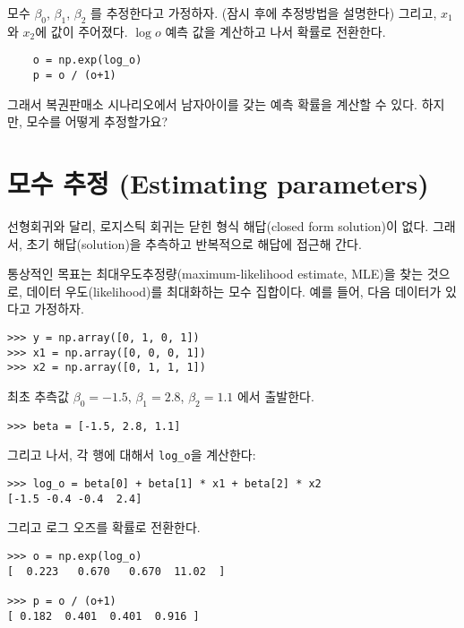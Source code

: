 모수 $\beta_0$, $\beta_1$, $\beta_2$ 를 추정한다고 가정하자.
 (잠시 후에 추정방법을 설명한다)
그리고, $x_1$와 $x_2$에 값이 주어졌다. 
$\log o$ 예측 값을 계산하고 나서 확률로 전환한다.

\begin{verbatim}
    o = np.exp(log_o)
    p = o / (o+1)
\end{verbatim}

그래서 복권판매소 시나리오에서 남자아이를 갖는 예측 확률을 계산할 수 있다. 하지만, 모수를 어떻게 추정할가요?

\section{모수 추정 (Estimating parameters)}

선형회귀와 달리, 로지스틱 회귀는 닫힌 형식 해답(closed form solution)이 없다. 그래서, 초기 해답(solution)을 추측하고 반복적으로 해답에 접근해 간다.

통상적인 목표는 최대우도추정량(maximum-likelihood estimate, MLE)을 찾는 것으로, 데이터 우도(likelihood)를 최대화하는 모수 집합이다.
예를 들어, 다음 데이터가 있다고 가정하자.

\begin{verbatim}
>>> y = np.array([0, 1, 0, 1])
>>> x1 = np.array([0, 0, 0, 1])
>>> x2 = np.array([0, 1, 1, 1])
\end{verbatim}

최초 추측값 $\beta_0=-1.5$, $\beta_1=2.8$, $\beta_2=1.1$ 에서 출발한다.

\begin{verbatim}
>>> beta = [-1.5, 2.8, 1.1]
\end{verbatim}

그리고 나서, 각 행에 대해서 \verb"log_o"을 계산한다:

\begin{verbatim}
>>> log_o = beta[0] + beta[1] * x1 + beta[2] * x2 
[-1.5 -0.4 -0.4  2.4]
\end{verbatim}

그리고 로그 오즈를 확률로 전환한다.

\begin{verbatim}
>>> o = np.exp(log_o)
[  0.223   0.670   0.670  11.02  ]

>>> p = o / (o+1)
[ 0.182  0.401  0.401  0.916 ]
\end{verbatim}

